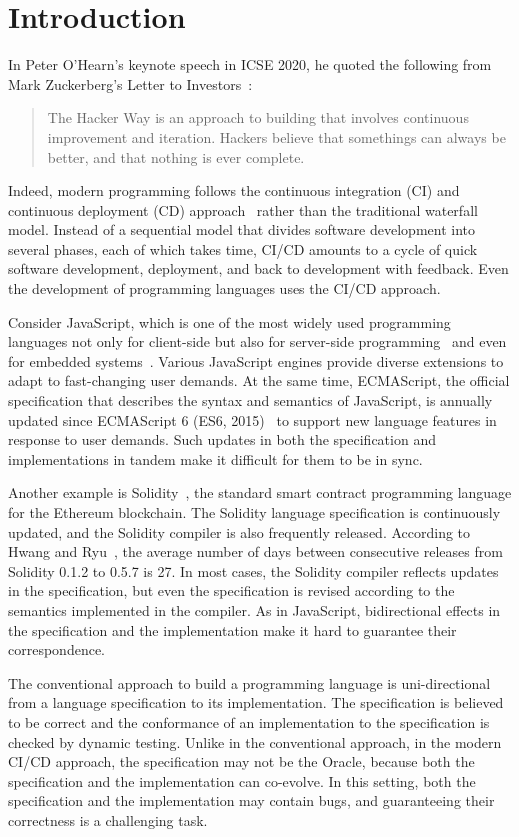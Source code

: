 \section{Introduction}\label{sec:intro}

In Peter O'Hearn's keynote speech in ICSE 2020, he quoted the following from
Mark Zuckerberg's Letter to Investors~\cite{mzletter}:
\begin{quote}
  The Hacker Way is an approach to building that involves continuous improvement
  and iteration.  Hackers believe that somethings can always be better, and that
  nothing is ever complete.
\end{quote}
Indeed, modern programming follows the continuous integration (CI) and
continuous deployment (CD) approach~\cite{cicd} rather than the traditional waterfall model.
Instead of a sequential model that divides software development into
several phases, each of which takes time, CI/CD amounts to a cycle of
quick software development, deployment, and back to development with
feedback. Even the development of programming languages uses the CI/CD approach.

Consider JavaScript, which is one of the most widely used programming languages
not only for client-side but also for server-side programming~\cite{nodejs} and
even for embedded systems~\cite{moddable,espruino,tessel2}.  Various JavaScript
engines provide diverse extensions to adapt to fast-changing user demands.  At
the same time, ECMAScript, the official specification that describes the syntax and
semantics of JavaScript, is annually updated since ECMAScript 6 (ES6,
2015)~\cite{es6} to support new language features in response to user demands.
Such updates in both the specification and implementations in tandem make it
difficult for them to be in sync.

Another example is Solidity~\cite{officialSolDoc}, the standard smart contract programming language
for the Ethereum blockchain.  The Solidity language specification is continuously
updated, and the Solidity compiler is also frequently released.  According to
Hwang and Ryu~\cite{solidity-gap}, the average number of days between consecutive
releases from Solidity 0.1.2 to 0.5.7 is 27.  In most cases, the Solidity compiler reflects
updates in the specification, but even the specification is revised
according to the semantics implemented in the compiler.  As in JavaScript,
bidirectional effects in the specification and the implementation make
it hard to guarantee their correspondence.

The conventional approach to build a programming language is uni-directional from
a language specification to its implementation.  The specification is believed to
be correct and the conformance of an implementation to the specification is
checked by dynamic testing.  Unlike in the conventional approach, in the modern CI/CD
approach, the specification may not be the Oracle, because both the
specification and the implementation can co-evolve.  In this setting, both the
specification and the implementation may contain bugs, and guaranteeing their
correctness is a challenging task.

